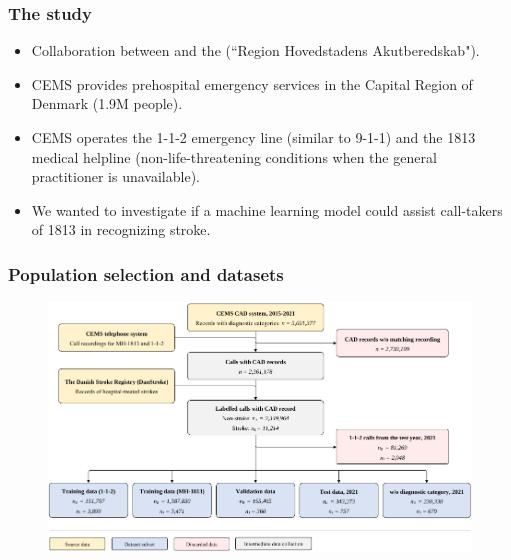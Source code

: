 \begin{frame}
    \frametitle{The study}
    \begin{itemize}
        \item Collaboration between  and the  (``Region Hovedstadens Akutberedskab").
        \item CEMS provides prehospital emergency services in the Capital Region of Denmark (1.9M people).
        \item CEMS operates the 1-1-2 emergency line (similar to 9-1-1) and the 1813 medical helpline (non-life-threatening conditions when the general practitioner is unavailable).
        \vspace{1em}
        \item We wanted to investigate if a machine learning model could assist call-takers of 1813 in recognizing stroke.
    \end{itemize}
\end{frame}


\begin{frame}
    \frametitle{Population selection and datasets}


    \begin{figure}
        \centering
        \includegraphics[width=0.65\paperwidth]{../graphics/paper_retrospective/data_flowchart.pdf}
    \end{figure}

\end{frame}



